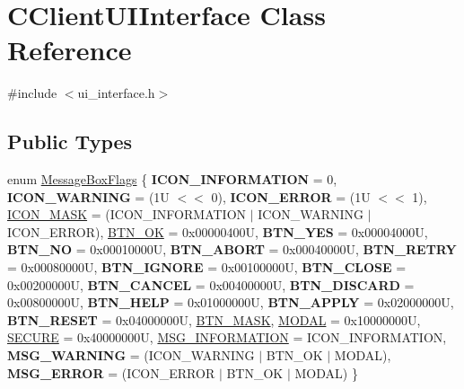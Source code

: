 \hypertarget{class_c_client_u_i_interface}{}\section{C\+Client\+U\+I\+Interface Class Reference}
\label{class_c_client_u_i_interface}


{\ttfamily \#include $<$ui\+\_\+interface.\+h$>$}

\subsection*{Public Types}
\begin{DoxyCompactItemize}
\item 
enum \mbox{\hyperlink{class_c_client_u_i_interface_a568cf07ecac3fac224d63b42a32e8bc1}{Message\+Box\+Flags}} \{ \newline
{\bfseries I\+C\+O\+N\+\_\+\+I\+N\+F\+O\+R\+M\+A\+T\+I\+ON} = 0, 
{\bfseries I\+C\+O\+N\+\_\+\+W\+A\+R\+N\+I\+NG} = (1U $<$$<$ 0), 
{\bfseries I\+C\+O\+N\+\_\+\+E\+R\+R\+OR} = (1U $<$$<$ 1), 
\mbox{\hyperlink{class_c_client_u_i_interface_a568cf07ecac3fac224d63b42a32e8bc1a74ba4315826bb22d61da9aa413894052}{I\+C\+O\+N\+\_\+\+M\+A\+SK}} = (I\+C\+O\+N\+\_\+\+I\+N\+F\+O\+R\+M\+A\+T\+I\+ON $\vert$ I\+C\+O\+N\+\_\+\+W\+A\+R\+N\+I\+NG $\vert$ I\+C\+O\+N\+\_\+\+E\+R\+R\+OR), 
\newline
\mbox{\hyperlink{class_c_client_u_i_interface_a568cf07ecac3fac224d63b42a32e8bc1a9874dd49edc70d5c347196ad8a631141}{B\+T\+N\+\_\+\+OK}} = 0x00000400U, 
{\bfseries B\+T\+N\+\_\+\+Y\+ES} = 0x00004000U, 
{\bfseries B\+T\+N\+\_\+\+NO} = 0x00010000U, 
{\bfseries B\+T\+N\+\_\+\+A\+B\+O\+RT} = 0x00040000U, 
\newline
{\bfseries B\+T\+N\+\_\+\+R\+E\+T\+RY} = 0x00080000U, 
{\bfseries B\+T\+N\+\_\+\+I\+G\+N\+O\+RE} = 0x00100000U, 
{\bfseries B\+T\+N\+\_\+\+C\+L\+O\+SE} = 0x00200000U, 
{\bfseries B\+T\+N\+\_\+\+C\+A\+N\+C\+EL} = 0x00400000U, 
\newline
{\bfseries B\+T\+N\+\_\+\+D\+I\+S\+C\+A\+RD} = 0x00800000U, 
{\bfseries B\+T\+N\+\_\+\+H\+E\+LP} = 0x01000000U, 
{\bfseries B\+T\+N\+\_\+\+A\+P\+P\+LY} = 0x02000000U, 
{\bfseries B\+T\+N\+\_\+\+R\+E\+S\+ET} = 0x04000000U, 
\newline
\mbox{\hyperlink{class_c_client_u_i_interface_a568cf07ecac3fac224d63b42a32e8bc1a76de9bd8c805f928e7085bf925617076}{B\+T\+N\+\_\+\+M\+A\+SK}}, 
\mbox{\hyperlink{class_c_client_u_i_interface_a568cf07ecac3fac224d63b42a32e8bc1ab03a110663fb005d666b74954a741304}{M\+O\+D\+AL}} = 0x10000000U, 
\mbox{\hyperlink{class_c_client_u_i_interface_a568cf07ecac3fac224d63b42a32e8bc1af90760e28d736dcf6da59169ea69cc88}{S\+E\+C\+U\+RE}} = 0x40000000U, 
\mbox{\hyperlink{class_c_client_u_i_interface_a568cf07ecac3fac224d63b42a32e8bc1aa19b607c0480fe7c25879f1f8fc54727}{M\+S\+G\+\_\+\+I\+N\+F\+O\+R\+M\+A\+T\+I\+ON}} = I\+C\+O\+N\+\_\+\+I\+N\+F\+O\+R\+M\+A\+T\+I\+ON, 
\newline
{\bfseries M\+S\+G\+\_\+\+W\+A\+R\+N\+I\+NG} = (I\+C\+O\+N\+\_\+\+W\+A\+R\+N\+I\+NG $\vert$ B\+T\+N\+\_\+\+OK $\vert$ M\+O\+D\+AL), 
{\bfseries M\+S\+G\+\_\+\+E\+R\+R\+OR} = (I\+C\+O\+N\+\_\+\+E\+R\+R\+OR $\vert$ B\+T\+N\+\_\+\+OK $\vert$ M\+O\+D\+AL)
 \}
\end{DoxyCompactItemize}
